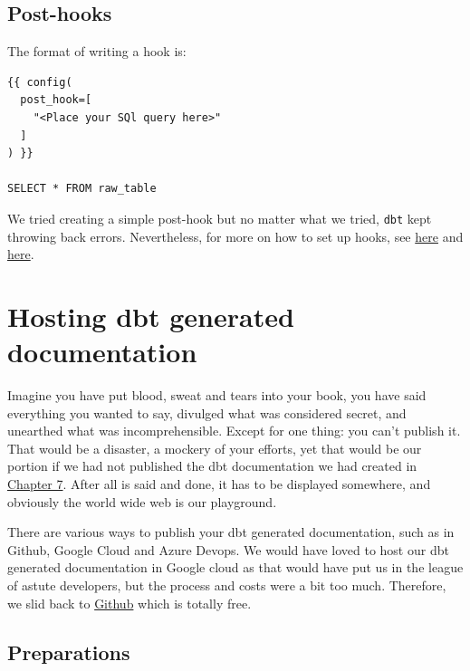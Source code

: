 \documentclass[
]{book}
\begin{document}
\hypertarget{post-hooks}{%
\section{Post-hooks}\label{post-hooks}}

The format of writing a hook is:

\begin{verbatim}
{{ config(
  post_hook=[
    "<Place your SQl query here>"
  ]
) }}

SELECT * FROM raw_table
\end{verbatim}

We tried creating a simple post-hook but no matter what we tried, \texttt{dbt} kept throwing back errors. Nevertheless, for more on how to set up hooks, see \href{https://docs.getdbt.com/docs/build/hooks-operations}{here} and \href{https://www.y42.com/docs/dbt-models/hooks}{here}.

\hypertarget{hosting-dbt-generated-documentation}{%
\chapter{Hosting dbt generated documentation}\label{hosting-dbt-generated-documentation}}

Imagine you have put blood, sweat and tears into your book, you have said everything you wanted to say, divulged what was considered secret, and unearthed what was incomprehensible. Except for one thing: you can't publish it. That would be a disaster, a mockery of your efforts, yet that would be our portion if we had not published the dbt documentation we had created in \protect\hyperlink{documentation}{Chapter 7}. After all is said and done, it has to be displayed somewhere, and obviously the world wide web is our playground.

There are various ways to publish your dbt generated documentation, such as in Github, Google Cloud and Azure Devops. We would have loved to host our dbt generated documentation in Google cloud as that would have put us in the league of astute developers, but the process and costs were a bit too much. Therefore, we slid back to \href{https://medium.com/dbt-local-taiwan/host-dbt-documentation-site-with-github-pages-in-5-minutes-7b80e8b62feb}{Github} which is totally free.

\hypertarget{preparations}{%
\section{Preparations}\label{preparations}}
\end{document}

